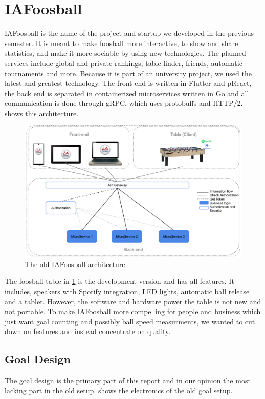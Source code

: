\section{IAFoosball}
IAFoosball is the name of the project and startup we developed in the previous semester. It is meant to make foosball more interactive, to show and share statistics, and make it more sociable by using new technologies. The planned services include global and private rankings, table finder, friends, automatic tournaments and more. Because it is part of an university project, we used the latest and greatest technology. The front end is written in Flutter and pReact, the back end is separated in containerized microservices written in Go and all communication is done through gRPC, which uses protobuffs and HTTP/2.  shows this architecture.

\begin{figure}[h!]
    \centering
    \includegraphics[scale=0.2]{figures/architecture-old.png}%
    \caption{The old IAFoosball architecture}\label{fig:architectureOld}
\end{figure}

The foosball table in \cref{fig:architectureOld} is the development version and has all features. It includes, speakers with Spotify integration, LED lights, automatic ball release and a tablet. However, the software and hardware power the table is not new  and not portable. To make IAFoosball more compelling for people and business which just want goal counting and possibly ball speed measurments, we wanted to cut down on features and instead concentrate on quality.\\


\subsection{Goal Design}
The goal design is the primary part of this report and in our opinion the most lacking part in the old setup. 
 shows the electronics of the old goal setup.

